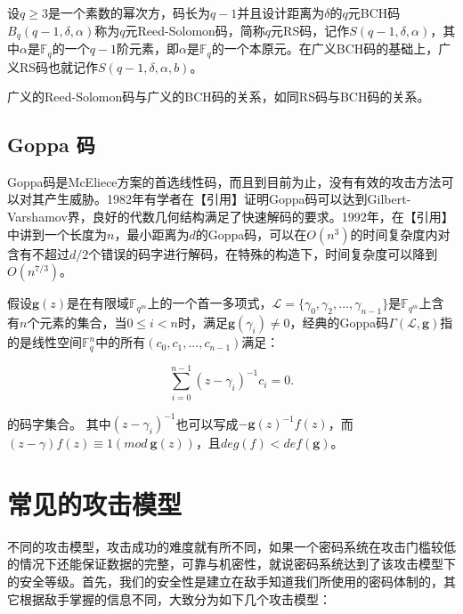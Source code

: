 \begin{define}[RS码]
	设$q \geq 3$是一个素数的幂次方，码长为$q - 1$并且设计距离为$\delta$的$q$元BCH码$B_q(q - 1, \delta, \alpha)$称为$q$元Reed-Solomon码，简称$q$元RS码，记作$S(q - 1, \delta, \alpha)$，其中$\alpha$是$\mathbb{F}_q$的一个$q - 1$阶元素，即$\alpha$是$\mathbb{F}_q$的一个本原元。在广义BCH码的基础上，广义RS码也就记作$S(q - 1, \delta, \alpha, b)$。
\end{define}

广义的Reed-Solomon码与广义的BCH码的关系，如同RS码与BCH码的关系。

\subsection{Goppa 码}
Goppa码是McEliece方案的首选线性码，而且到目前为止，没有有效的攻击方法可以对其产生威胁。1982年有学者在【引用】证明Goppa码可以达到Gilbert-Varshamov界，良好的代数几何结构满足了快速解码的要求。1992年，在【引用】中讲到一个长度为$n$，最小距离为$d$的Goppa码，可以在$O(n^3)$的时间复杂度内对含有不超过$d/2$个错误的码字进行解码，在特殊的构造下，时间复杂度可以降到$O(n^{7/3})$。

\begin{define}[Goppa码]
	假设$\mathbf{g}(z)$是在有限域$\mathbb{F}_{q^m}$上的一个首一多项式，$\mathcal{L}=\{\gamma_0,\gamma_2,...,\gamma_{n-1}\}$是$\mathbb{F}_{q^m}$上含有$n$个元素的集合，当$0 \leq i <n$时，满足$\mathbf{g}(\gamma_i)\neq0$，经典的Goppa码$\Gamma(\mathcal{L},\mathbf{g})$指的是线性空间$\mathbb{F}_q^n$中的所有$(c_0,c_1,...,c_{n-1})$满足：
	
    \begin{equation}
        \sum_{i=0}^{n-1} (z - \gamma_i)^{-1}c_i = 0.
    \end{equation}
	
	\begin{flushleft}
		的码字集合。 其中$(z - \gamma_i)^{-1}$也可以写成$-\mathbf{g}(z)^{-1}f(z)$，而$(z-\gamma)f(z) \equiv 1(mod~\mathbf{g}(z))$，且$deg(f) < def(\mathbf{g})$。
	\end{flushleft}
\end{define}

\section{常见的攻击模型}
不同的攻击模型，攻击成功的难度就有所不同，如果一个密码系统在攻击门槛较低的情况下还能保证数据的完整，可靠与机密性，就说密码系统达到了该攻击模型下的安全等级。首先，我们的安全性是建立在敌手知道我们所使用的密码体制的，其它根据敌手掌握的信息不同，大致分为如下几个攻击模型：

